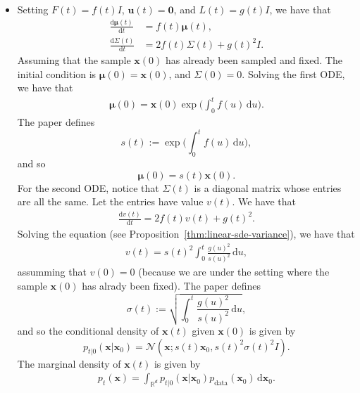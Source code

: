 \documentclass[10pt]{article}
\newtheorem{theorem}[lemma]{Theorem}
\newcommand{\dee}{\mathrm{d}}
\newcommand{\ve}[1]{\mathbf{#1}}
\newcommand{\ves}[1]{\boldsymbol{#1}}
\newcommand{\mcal}[1]{\mathcal{#1}}
\newcommand{\Real}{\mathbb{R}}
\newcommand{\data}{\mathrm{data}}
\begin{document}
\begin{itemize}
  \begin{theorem}
    Consider a {\bf linear SDE} of the form
    \begin{align*}
      \dee \ve{x} = \big(F(t)\ve{x} + \ve{u}(t) \big)\, \dee t + L(t)\, \dee \ve{W} 
    \end{align*}
    where $F: \Real \rightarrow \Real^{d \times d}$, $\ve{u}: \Real \rightarrow \Real^d$, and $L: \Real \rightarrow \Real^{d \times d}$. We have that the solution of this equation is a Gaussian process whose mean and covariance matrix,
    \begin{align*}
      \ves{\mu}(t) &= E[\ve{x}(t)], \\ 
      \Sigma(t) &= E[(\ve{x}(t) - \ves{\mu}(t)) (\ve{x}(t) - \ves{\mu}(t))^T],
    \end{align*}
    satisfy the ODEs
    \begin{align*}
      \frac{\dee\ves{\mu}(t)}{\dee t} &= F(t) \ves{\mu}(t), \\
      \frac{\dee\Sigma(t)}{\dee t} &= F(t) \Sigma(t) + \Sigma(t) F(t)^T + L(t)L(t)^T. 
    \end{align*}
  \end{theorem}
  \item Setting $F(t) = f(t)I$, $\ve{u}(t) = \ve{0}$, and $L(t) = g(t)I$, we have that
  \begin{align*}
    \frac{\dee\ves{\mu}(t)}{\dee t} &= f(t) \ves{\mu}(t), \\
    \frac{\dee\Sigma(t)}{\dee t} &= 2 f(t) \Sigma(t) + g(t)^2 I. 
  \end{align*}
  Assuming that the sample $\ve{x}(0)$ has already been sampled and fixed. The initial condition is $\ves{\mu}(0) = \ve{x}(0)$, and $\Sigma(0) = 0$. Solving the first ODE, we have that
  \begin{align*}
    \ves{\mu}(0) = \ve{x}(0) \exp\bigg( \int_0^t f(u)\, \dee u \bigg).
  \end{align*}
  The paper defines $$s(t) := \exp\bigg( \int_0^t f(u)\, \dee u\bigg),$$ and so $$\ves{\mu}(0) = s(t) \ve{x}(0).$$
  For the second ODE, notice that $\Sigma(t)$ is a diagonal matrix whose entries are all the same. Let the entries have value $v(t)$. We have that
  \begin{align*}
    \frac{\dee v(t)}{\dee t} = 2f(t)v(t) + g(t)^2.
  \end{align*}
  Solving the equation (see Proposition~\ref{thm:linear-sde-variance}), we have that
  \begin{align*}
    v(t) = s(t)^2 \int_0^t \frac{g(u)^2}{s(u)^2}\, \dee u,
  \end{align*}
  assumming that $v(0) = 0$ (because we are under the setting where the sample $\ve{x}(0)$ has alrady been fixed). The paper defines $$\sigma(t) := \sqrt{\int_0^t \frac{g(u)^2}{s(u)^2}\, \dee u},$$
  and so the conditional density of $\ve{x}(t)$ given $\ve{x}(0)$ is given by
  $$p_{t|0}(\ve{x}|\ve{x}_0) = \mcal{N}(\ve{x} ; s(t)\ve{x}_0, s(t)^2 \sigma(t)^2 I ). $$
  The marginal density of $\ve{x}(t)$ is given by
  \begin{align*}
    p_t(\ve{x}) = \int_{\Real^d} p_{t|0}(\ve{x} | \ve{x}_0) p_{\data}(\ve{x}_0)\, \dee \ve{x}_0.
  \end{align*}


\end{itemize}
\end{document}
